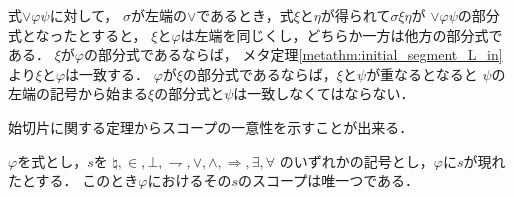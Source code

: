 \begin{metaprf}
\begin{description}
				式$\vee \varphi \psi$に対して，
				$\sigma$が左端の$\vee$であるとき，式$\xi$と$\eta$が得られて$\sigma \xi \eta$が
				$\vee \varphi \psi$の部分式となったとすると，
				$\xi$と$\varphi$は左端を同じくし，どちらか一方は他方の部分式である．
				$\xi$が$\varphi$の部分式であるならば，
				メタ定理\ref{metathm:initial_segment_L_in}より$\xi$と$\varphi$は一致する．
				$\varphi$が$\xi$の部分式であるならば，$\xi$と$\psi$が重なるとなると
				$\psi$の左端の記号から始まる$\xi$の部分式と$\psi$は一致しなくてはならない．
				\QED
		\end{description}
	\end{metaprf}
	
	始切片に関する定理からスコープの一意性を示すことが出来る．
	
	\begin{screen}
		\begin{metathm}[スコープの一意性]\label{metathm:uniqueness_of_scopes_L_in}
			$\varphi$を式とし，$s$を
			$\natural,\in,\bot,\rightharpoondown,\vee,\wedge,\Longrightarrow,\exists,\forall$
			のいずれかの記号とし，$\varphi$に$s$が現れたとする．
			このとき$\varphi$におけるその$s$のスコープは唯一つである．
		\end{metathm}
	\end{screen}
	
